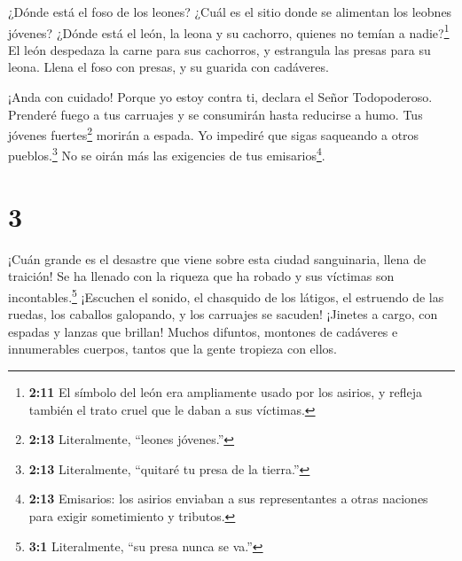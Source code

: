  ¿Dónde está el foso de los leones? ¿Cuál es el sitio donde
se alimentan los leobnes jóvenes? ¿Dónde está el león, la leona y su
cachorro, quienes no temían a nadie?\footnote{\textbf{2:11} El símbolo
  del león era ampliamente usado por los asirios, y refleja también el
  trato cruel que le daban a sus víctimas.}  El león
despedaza la carne para sus cachorros, y estrangula las presas para su
leona. Llena el foso con presas, y su guarida con cadáveres.

 ¡Anda con cuidado! Porque yo estoy contra ti, declara el
Señor Todopoderoso. Prenderé fuego a tus carruajes y se consumirán hasta
reducirse a humo. Tus jóvenes fuertes\footnote{\textbf{2:13}
  Literalmente, ``leones jóvenes.''} morirán a espada. Yo impediré que
sigas saqueando a otros pueblos.\footnote{\textbf{2:13} Literalmente,
  ``quitaré tu presa de la tierra.''} No se oirán más las exigencies de
tus emisarios\footnote{\textbf{2:13} Emisarios: los asirios enviaban a
  sus representantes a otras naciones para exigir sometimiento y
  tributos.}.

\hypertarget{section-2}{%
\section{3}\label{section-2}}

 ¡Cuán grande es el desastre que viene sobre esta ciudad
sanguinaria, llena de traición! Se ha llenado con la riqueza que ha
robado y sus víctimas son incontables.\footnote{\textbf{3:1}
  Literalmente, ``su presa nunca se va.''}  ¡Escuchen el
sonido, el chasquido de los látigos, el estruendo de las ruedas, los
caballos galopando, y los carruajes se sacuden!  ¡Jinetes a
cargo, con espadas y lanzas que brillan! Muchos difuntos, montones de
cadáveres e innumerables cuerpos, tantos que la gente tropieza con
ellos.

